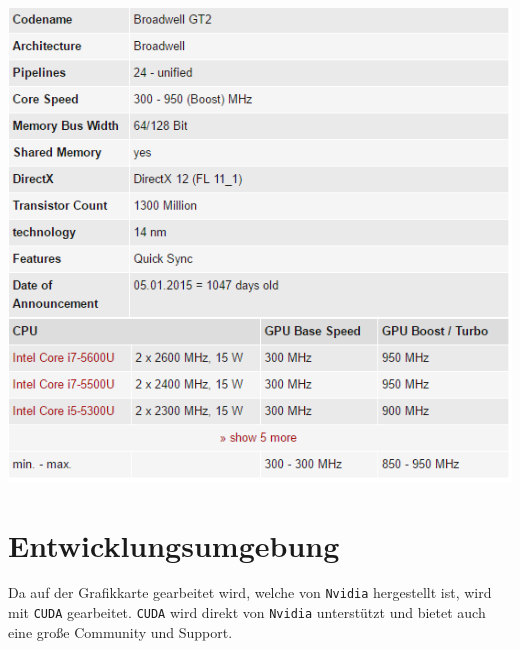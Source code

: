 \begin{minipage}{\linewidth}
	\centering
	\includegraphics[width=0.8\linewidth]{images/gpu_specs}
\end{minipage}

\section{Entwicklungsumgebung}
Da auf der Grafikkarte gearbeitet wird, welche von \verb|Nvidia| hergestellt ist, wird mit \verb|CUDA| gearbeitet. \verb|CUDA| wird direkt von \verb|Nvidia| unterstützt und bietet auch eine große Community und Support.

